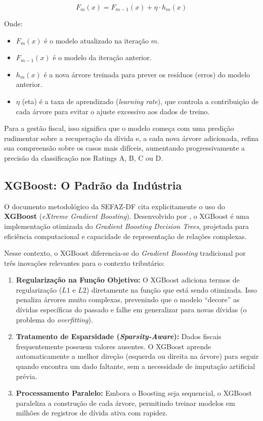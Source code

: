 \begin{equation}
    F_{m}(x) = F_{m-1}(x) + \eta \cdot h_m(x)
\end{equation}

Onde:
\begin{itemize}
    \item $F_{m}(x)$ é o modelo atualizado na iteração $m$.
    \item $F_{m-1}(x)$ é o modelo da iteração anterior.
    \item $h_m(x)$ é a nova árvore treinada para prever os resíduos (erros) do modelo anterior.
    \item $\eta$ (eta) é a taxa de aprendizado (\textit{learning rate}), que controla a contribuição de cada árvore para evitar o ajuste excessivo aos dados de treino.
\end{itemize}

Para a gestão fiscal, isso significa que o modelo começa com uma predição rudimentar sobre a recuperação da dívida e, a cada nova árvore adicionada, refina sua compreensão sobre os casos mais difíceis, aumentando progressivamente a precisão da classificação nos Ratings A, B, C ou D.

\subsection{XGBoost: O Padrão da Indústria}
O documento metodológico da SEFAZ-DF cita explicitamente o uso do \textbf{XGBoost} (\textit{eXtreme Gradient Boosting}). Desenvolvido por , o XGBoost é uma implementação otimizada do \textit{Gradient Boosting Decision Trees}, projetada para eficiência computacional e capacidade de representação de relações complexas.

Nesse contexto, o XGBoost diferencia-se do \textit{Gradient Boosting} tradicional por três inovações relevantes para o contexto tributário:

\begin{enumerate}
    \item \textbf{Regularização na Função Objetivo:} O XGBoost adiciona termos de regularização ($L1$ e $L2$) diretamente na função que está sendo otimizada. Isso penaliza árvores muito complexas, prevenindo que o modelo ``decore'' as dívidas específicas do passado e falhe em generalizar para novas dívidas (o problema do \textit{overfitting}).

    \item \textbf{Tratamento de Esparsidade (\textit{Sparsity-Aware}):} Dados fiscais frequentemente possuem valores ausentes. O XGBoost aprende automaticamente a melhor direção (esquerda ou direita na árvore) para seguir quando encontra um dado faltante, sem a necessidade de imputação artificial prévia.

    \item \textbf{Processamento Paralelo:} Embora o Boosting seja sequencial, o XGBoost paraleliza a construção de cada árvore, permitindo treinar modelos em milhões de registros de dívida ativa com rapidez.
\end{enumerate}

